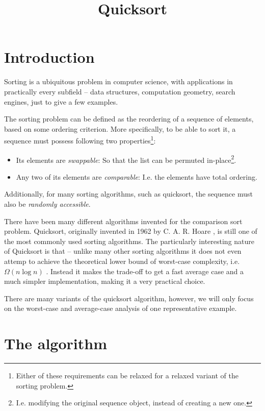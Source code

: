\documentclass[]{finalproject}
\title{Quicksort}
\subtitle{}
\begin{document}
\maketitle

\section{Introduction} \label{introduction}

Sorting is a ubiquitous problem in computer science, with applications in practically every subfield -- data structures, computation geometry, search engines, just to give a few examples.

The sorting problem can be defined as the reordering of a sequence of elements, based on some ordering criterion. More specifically, to be able to sort it, a sequence must possess following two properties\footnote{Either of these requirements can be relaxed for a relaxed variant of the sorting problem.}:

\begin{itemize}
\item Its elements are \textit{swappable}: So that the list can be permuted in-place\footnote{I.e. modifying the original sequence object, instead of creating a new one.}.
\item Any two of its elements are \textit{comparable}: I.e. the elements have total ordering.
\end{itemize}

Additionally, for many sorting algorithms, such as quicksort, the sequence must also be \textit{randomly accessible}.

There have been many different algorithms invented for the comparison sort problem. Quicksort, originally invented in 1962 by C. A. R. Hoare \cite{hoare1962quicksort}, is still one of the most commonly used sorting algorithms. The particularly interesting nature of Quicksort is that -- unlike many other sorting algorithms it does not even attemp to achieve the theoretical lower bound of worst-case complexity, i.e. $\Omega(n\log n)$ \cite[p.~193]{clrs}. Instead it makes the trade-off to get a fast average case and a much simpler implementation, making it a very practical choice.

There are many variants of the quicksort algorithm, however, we will only focus on the worst-case and average-case analysis of one representative example.

\section{The algorithm}
\end{document}
